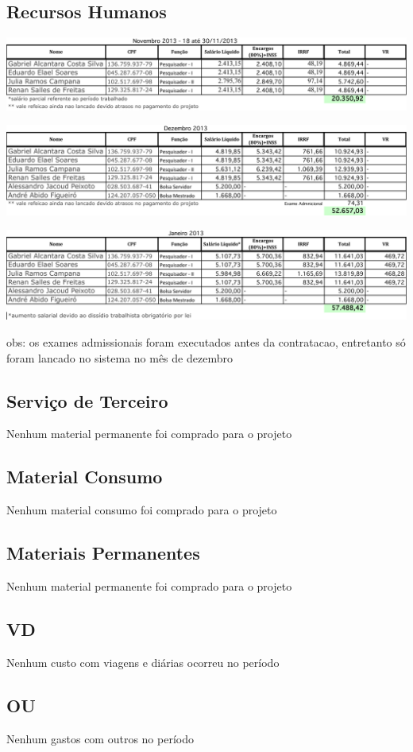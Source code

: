 \vfill

\newpage

\subsection{Recursos Humanos}


\begin{center}
  \includegraphics[width=1\columnwidth]{figs/financeiro/RH_novembro.pdf}
\end{center}

\begin{center}
  \includegraphics[width=1\columnwidth]{figs/financeiro/RH_dezembro.pdf}
\end{center}

\begin{center}
  \includegraphics[width=1\columnwidth]{figs/financeiro/RH_janeiro.pdf}
\end{center}

obs: os exames admissionais foram executados antes da contratacao, entretanto só foram lancado no sistema no mês de dezembro

\subsection{Serviço de Terceiro}
Nenhum material permanente foi comprado para o projeto

\subsection{Material Consumo}
Nenhum material consumo foi comprado para o projeto

\subsection{Materiais Permanentes}
Nenhum material permanente foi comprado para o projeto

\subsection{VD}
Nenhum custo com viagens e diárias ocorreu no período 

\subsection{OU}
Nenhum gastos com outros no período




